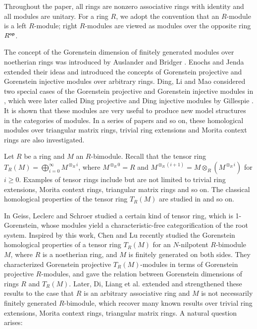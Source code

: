 \documentclass[10pt,twoside]{amsart}
\theoremstyle{bfupright head,slanted body}
\theoremstyle{bfupright head,upright body}
\theoremstyle{fixed bf head,slanted body}
\theoremstyle{fixed bf head,upright body}
\theoremstyle{numbered paragraph}
\numberwithin{equation}{res}
\newcommand{\Rop}{R^{\sf op}}
\begin{document}
Throughout the paper, all rings are nonzero associative rings with identity and
all modules are unitary.
For a ring $R$, we adopt the convention that an $R$-module is a left $R$-module;
right $R$-modules are viewed as modules over the opposite ring $\Rop$.

The concept of the Gorenstein dimension of finitely generated modules over noetherian rings was introduced by Auslander and Bridger \cite{1969AB}.
Enochs and Jenda \cite{1995EnochsGP} extended their ideas and introduced the concepts of Gorenstein projective and Gorenstein injective modules over arbitrary rings.
Ding, Li and Mao considered two special cases of the Gorenstein projective and Gorenstein injective modules in \cite{DLM}, 
which were later called Ding projective and Ding injective modules by Gillespie \cite{G}.
It is shown that these modules 
are very useful to produce new model structures in the categories of modules.
In a series of papers \cite{A, GP, 2022XI, 2020GPTRI, 2022Mao, 2023Mao, TriExtGPMao} and so on,
these homological modules over triangular matrix rings,
trivial ring extensions and Morita context rings are also investigated.

Let $R$ be a ring and $M$ an $R$-bimodule.
Recall that the tensor ring $T_R(M)=\bigoplus_{i=0}^\infty M^{\otimes_Ri}$,
where $M^{\otimes_R0}=R$ and
$M^{\otimes_R(i+1)}=M\otimes_R(M^{\otimes_Ri})$ for $i \geqslant 0$.
Examples of tensor rings include but are not limited to
trivial ring extensions, Morita context rings, triangular matrix rings and so on.
The classical homological properties of the tensor ring $T_R(M)$ are studied
in \cite{1991Cohn, 2012Ample, 1975Roganov} and so on.

In \cite{GLS} Geiss, Leclerc and Schroer studied a certain kind of tensor ring, which is 1-Gorenstein, 
whose modules yield a characteristic-free categorification of the root system. 
Inspired by this work, Chen and Lu \cite{CL} recently studied the Gorenstein
homological properties of a tensor ring $T_R(M)$ for
an $N$-nilpotent $R$-bimodule $M$, where $R$ is a noetherian ring, and $M$ is finitely generated on both sides. 
They characterized Gorenstein projective $T_R(M)$-modules in terms of Gorenstein projective $R$-modules, 
and gave the relation between Gorenstein dimensions of rings $R$ and $T_R(M)$.
Later, Di, Liang et al. \cite{DL} extended and strengthened these results to the case that $R$ is an arbitrary associative ring 
and $M$ is not necessarily finitely generated $R$-bimodule, which recover many known results over trivial ring extensions, Morita context rings, triangular matrix rings.
A natural question arises:
\end{document}

